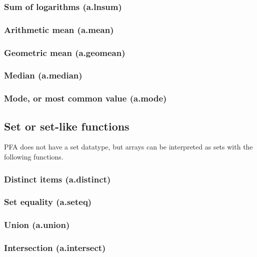 \documentclass{article}
\theoremstyle{definition}
\begin{document}
\subsubsection{Sum of logarithms (a.lnsum)}

\subsubsection{Arithmetic mean (a.mean)}

\subsubsection{Geometric mean (a.geomean)}

\subsubsection{Median (a.median)}

\subsubsection{Mode, or most common value (a.mode)}

\subsection{Set or set-like functions}

PFA does not have a set datatype, but arrays can be interpreted as sets with the following functions.

\subsubsection{Distinct items (a.distinct)}

\subsubsection{Set equality (a.seteq)}

\subsubsection{Union (a.union)}

\subsubsection{Intersection (a.intersect)}
\end{document}
